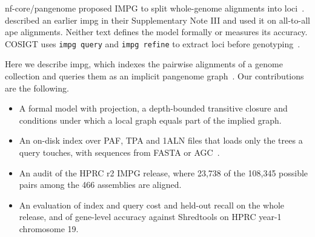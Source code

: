 nf-core/pangenome proposed IMPG to split whole-genome alignments into loci~\citep{Heumos2024nfcore}.
\citet{Yoo2025apes} described an earlier impg in their Supplementary Note III and used it on all-to-all ape alignments.
Neither text defines the model formally or measures its accuracy.
COSIGT uses \texttt{impg query} and \texttt{impg refine} to extract loci before genotyping~\citep{Bolognini2026cosigt}.

Here we describe impg, which indexes the pairwise alignments of a genome collection and queries them as an implicit pangenome graph~\citep{Guarracino2026impg}.
Our contributions are the following.
\begin{itemize}
\item A formal model with projection, a depth-bounded transitive closure and conditions under which a local graph equals part of the implied graph.
\item An on-disk index over PAF, TPA and 1ALN files that loads only the trees a query touches, with sequences from FASTA or AGC~\citep{Deorowicz2023agc}.
\item An audit of the HPRC r2 IMPG release, where 23,738 of the 108,345 possible pairs among the 466 assemblies are aligned.
\item An evaluation of index and query cost and held-out recall on the whole release, and of gene-level accuracy against Shredtools on HPRC year-1 chromosome 19.
\end{itemize}
